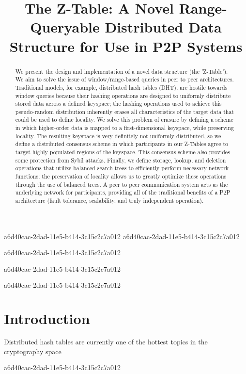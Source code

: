 \documentclass[12pt]{article}
\title{The Z-Table: A Novel Range-Queryable Distributed Data Structure for Use in P2P Systems}
\begin{document}
a6d40cac-2dad-11e5-b414-3c15c2c7a012
a6d40cac-2dad-11e5-b414-3c15c2c7a012\maketitle

a6d40cac-2dad-11e5-b414-3c15c2c7a012\begin{abstract}
We present the design and implementation of a novel data structure (the 'Z-Table'). We aim to solve the issue of window/range-based queries in peer to peer architectures. Traditional models, for example,  distributed hash tables (DHT), are hostile towards window queries because their hashing operations are designed to uniformly distribute stored data across a defined keyspace; the hashing operations used to achieve this pseudo-random distribution inherently erases all characteristics of the target data that could be used to define locality. We solve this problem of erasure by defining a scheme in which higher-order data is mapped to a first-dimensional keyspace, while preserving locality. The resulting keyspace is very definitely not uniformly distributed, so we define a distributed consensus scheme in which participants in our Z-Tables agree to target highly populated regions of the keyspace. This consensus scheme also provides some protection from Sybil attacks. Finally, we define storage, lookup, and deletion operations that utilize balanced search trees to efficiently perform necessary network functions; the preservation of locality allows us to greatly optimize these operations through the use of balanced trees. A peer to peer communication system acts as the underlying network for participants, providing all of the traditional benefits of a P2P architecture (fault tolerance, scalability, and truly independent operation).
\end{abstract}
a6d40cac-2dad-11e5-b414-3c15c2c7a012

\newpage
a6d40cac-2dad-11e5-b414-3c15c2c7a012\section{Introduction}
Distributed hash tables are currently one of the hottest topics in the cryptography space~\cite{Stoica:2001dj,Rowstron:2001ea,Ratnasamy:2001wn}

a6d40cac-2dad-11e5-b414-3c15c2c7a012\printbibliography
\end{document}
